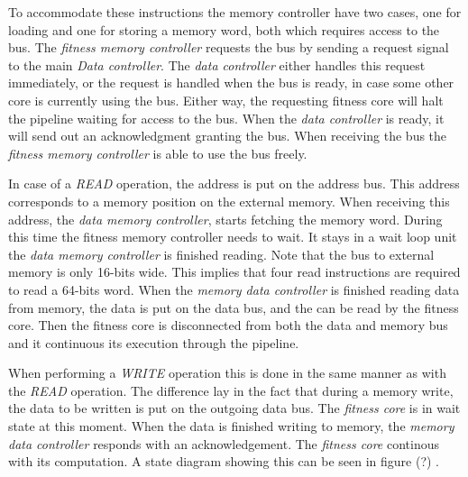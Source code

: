 To accommodate these instructions the memory controller have two cases, one for loading and one for storing a memory word, both which requires access to the bus. The \emph{fitness memory controller} requests the bus by sending a request signal to the main \emph{Data controller}. 
The \emph{data controller} either handles this request immediately, or the request is handled when the bus is ready, in case some other core is currently using the bus.  Either way, the requesting fitness core will halt the pipeline waiting for access to the bus. When the \emph{data controller} is ready, it will send out an acknowledgment granting the bus. When receiving the bus the \emph{fitness memory controller} is able to use the bus freely. 

In case of a \emph{READ} operation, the address is put on the address bus. This address corresponds to a memory position on the external memory. When receiving this address, the \emph{data memory controller}, starts fetching the memory word. During this time the fitness memory controller needs to wait. It stays in a wait loop unit the \emph{data memory controller} is finished reading. Note that the bus to external memory is only 16-bits wide. This implies that four read instructions are required to read a 64-bits word. When the \emph{memory data controller} is finished reading data from memory, the data is put on the data bus, and the can be read by the fitness core. Then the fitness core is disconnected from both the data and memory bus and it continuous its execution through the pipeline.


When performing a \emph{WRITE} operation this is done in the same manner as with the \emph{READ} operation. The difference lay in the fact that during a memory write, the data to be written is put on the outgoing data bus. The \emph{fitness core} is in wait state at this moment. When the data is finished writing to memory, the \emph{memory data controller} responds with an acknowledgement. The \emph{fitness core} continous with its computation.  
A state diagram showing this can be seen in figure (?) .   






